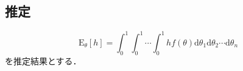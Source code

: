 \subsection{推定}
\begin{equation} \label{eq:exp}
    \mathrm{E}_\theta [h] = \int_{0}^{1} \int_{0}^{1} \cdots \int_{0}^{1} h f(\theta) \mathrm{d}\theta_1 \mathrm{d}\theta_2 \cdots \mathrm{d}\theta_n
\end{equation}
を推定結果とする．

